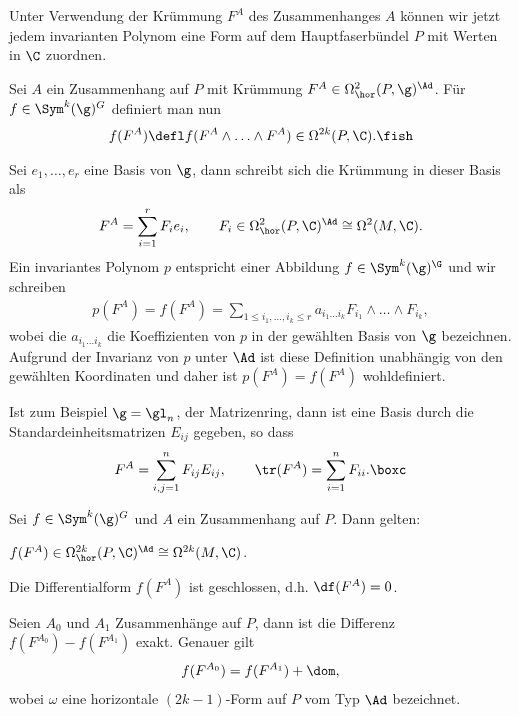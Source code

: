 \documentclass[%
	paper=a5,%
	fleqn,%
	DIV=18,%
	BCOR=0mm,
	fontsize=11pt,
	titlepage=false,%
	bibliography=totoc,
	DIV=18,%
	twoside=true,
	pdftitle=Riemannsche Geometrie,
	pdfauthor=Uwe Semmelmann,
	numbers=noendperiod]%
	{scrbook}
\begin{document}
Unter Verwendung der Krümmung $F^A$ des Zusammenhanges $A$ können wir jetzt
jedem invarianten Polynom eine Form auf dem Hauptfaserbündel $P$ mit Werten in
$\C$ zuordnen.

\begin{defn}
Sei $A$ ein Zusammenhang auf $P$ mit Krümmung $F^A\in\Omega_\hor^2(P,\g)^\Ad$.
Für $f\in \Sym^k(\g)^G$ definiert man nun
\begin{align*}
f(F^A) \defl f(F^A\wedge \ldots \wedge F^A)\in \Omega^{2k}(P,\C).\fish
\end{align*}
\end{defn}

\begin{ex}
Sei $e_1,\ldots,e_r$ eine Basis von $\g$, dann schreibt sich die Krümmung in
dieser Basis als
\begin{align*}
F^A = \sum_{i=1}^r F_i e_i,\qquad F_i\in\Omega_\hor^2(P,\C)^\Ad \cong
\Omega^2(M,\C).
\end{align*}
Ein invariantes Polynom $p$ entspricht einer Abbildung $f\in \Sym^k(\g)^\G$  und
wir schreiben
\begin{align*}
p(F^A) = f(F^A) = \sum_{1\le i_1,\ldots,i_k\le r} a_{i_1\ldots i_k}
F_{i_1}\wedge \ldots \wedge F_{i_k},
\end{align*}
wobei die $a_{i_1\ldots i_k}$ die Koeffizienten von $p$ in der gewählten Basis
von $\g$ bezeichnen. Aufgrund der Invarianz von $p$ unter $\Ad$ ist diese
Definition unabhängig von den gewählten Koordinaten und daher ist $p(F^A)
= f(F^A)$ wohldefiniert.

Ist zum Beispiel $\g = \gl_n$, der Matrizenring, dann ist eine Basis durch die
Standardeinheitsmatrizen $E_{ij}$ gegeben, so dass
\begin{align*}
F^A = \sum_{i,j=1}^n F_{ij}E_{ij},\qquad \tr(F^A) = \sum_{i=1}^n F_{ii}.\boxc
\end{align*}
\end{ex}

\begin{lem}
Sei $f\in \Sym^k(\g)^G$ und $A$ ein Zusammenhang auf $P$. Dann gelten:
\begin{propenum}
\item $f(F^A) \in \Omega_\hor^{2k}(P,\C)^{\Ad}\cong \Omega^{2k}(M,\C)$.
\item Die Differentialform $f(F^A)$ ist geschlossen, d.h. $\df(F^A) = 0$.
\item Seien $A_0$ und $A_1$ Zusammenhänge auf $P$, dann ist die
Differenz $f(F^{A_0})-f(F^{A_1})$ exakt. Genauer gilt
\begin{align*}
f(F^{A_0}) = f(F^{A_1}) + \dom,
\end{align*}
wobei $\omega$ eine horizontale $(2k-1)$-Form auf $P$ vom Typ $\Ad$
bezeichnet.~\fish
\end{propenum}
\end{lem}
\end{document}
